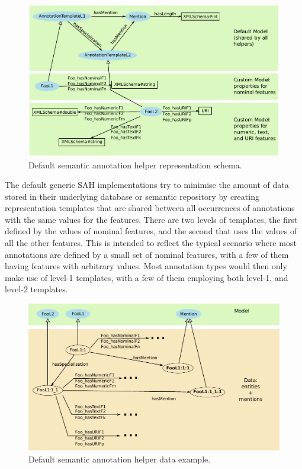 \begin{figure}[htb]
\begin{center}
\includegraphics[scale=0.66]{img/dsah-model}
\caption{Default semantic annotation helper representation schema.}
\label{fig:dsah-model}
\end{center}
\end{figure}

The default generic SAH implementations try to minimise the amount of data stored in their underlying database or semantic repository
by creating representation templates that are shared
between all occurrences of annotations with the same values for the features.
There are two levels of templates, the first defined by the values of nominal
features, and the second that uses the values of all the other features. This
is intended to reflect the typical scenario where most annotations are defined
by a small set of nominal features, with a few of them having features with
arbitrary values. Most annotation types would then only make use of level-1
templates, with a few of them employing both level-1, and level-2 templates.

\begin{figure}[htb]
\begin{center}
\includegraphics[scale=0.66]{img/dsah-data}
\caption{Default semantic annotation helper data example.}
\label{fig:dsah-data}
\end{center}
\end{figure}

